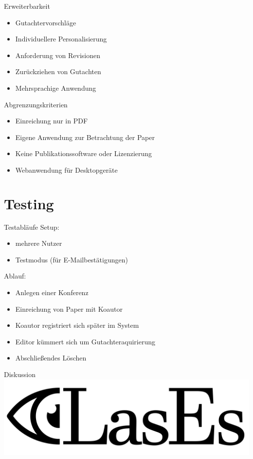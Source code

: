 \documentclass{beamer}
\begin{document}
\begin{frame}{Erweiterbarkeit}
	\pause
	\begin{itemize}
		\item Gutachtervorschläge
		\pause
		\item Individuellere Personalisierung
		\pause
		\item Anforderung von Revisionen
		\pause
		\item Zurückziehen von Gutachten
		\pause
		\item Mehrsprachige Anwendung
	\end{itemize}
\end{frame}

\begin{frame}{Abgrenzungskriterien}
	\pause
	\begin{itemize}
		\item Einreichung nur in PDF
		\pause
		\item Eigene Anwendung zur Betrachtung der Paper
		\pause
		\item Keine Publikationssoftware oder Lizenzierung
		\pause
		\item Webanwendung für Desktopgeräte
	\end{itemize}
\end{frame}

\section{Testing}
\begin{frame}{Testabläufe}
	\pause
	Setup:
	\begin{itemize}
		\item mehrere Nutzer
		\item Testmodus (für E-Mailbestätigungen)
	\end{itemize}

	\pause

	Ablauf:
	\begin{itemize}
		\item Anlegen einer Konferenz
		\item Einreichung von Paper mit Koautor
		\item Koautor registriert sich später im System
		\item Editor kümmert sich um Gutachteraquirierung
		\item Abschließendes Löschen
	\end{itemize}
\end{frame}

\begin{frame}{Diskussion}
	\centering
	\includegraphics[width=0.7\linewidth]{../../docs/Pflichtenheft/graphics/LasEs-logo}
\end{frame}
\end{document}
